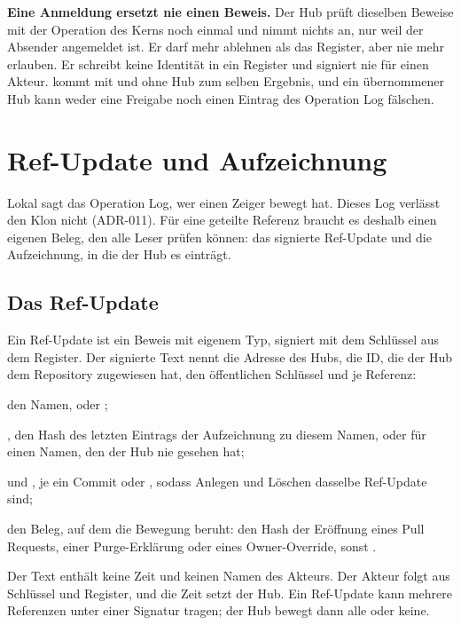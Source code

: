 \startinfobox
{\bf Eine Anmeldung ersetzt nie einen Beweis.}
Der Hub prüft dieselben Beweise mit der Operation des Kerns noch einmal und nimmt nichts an, nur
weil der Absender angemeldet ist.
Er darf mehr ablehnen als das Register, aber nie mehr erlauben.
Er schreibt keine Identität in ein Register und signiert nie für einen Akteur.
 kommt mit und ohne Hub zum selben Ergebnis, und ein übernommener Hub kann weder
eine Freigabe noch einen Eintrag des Operation Log fälschen.
\stopinfobox

\section[sec:ref-update]{Ref-Update und Aufzeichnung}

Lokal sagt das Operation Log, wer einen Zeiger bewegt hat.
Dieses Log verlässt den Klon nicht (ADR-011).
Für eine geteilte Referenz braucht es deshalb einen eigenen Beleg, den alle Leser prüfen können:
das signierte Ref-Update und die Aufzeichnung, in die der Hub es einträgt.

\subsection{Das Ref-Update}

Ein Ref-Update ist ein Beweis mit eigenem Typ, signiert mit dem Schlüssel aus dem Register.
Der signierte Text nennt die Adresse des Hubs, die ID, die der Hub dem Repository zugewiesen hat,
den öffentlichen Schlüssel und je Referenz:

\startitemize[packed]
\item den Namen,  oder ;
\item {}, den Hash des letzten Eintrags der Aufzeichnung zu diesem Namen, oder
\type{-} für einen Namen, den der Hub nie gesehen hat;
\item {} und , je ein Commit oder \type{-}, sodass Anlegen und Löschen
dasselbe Ref-Update sind;
\item den Beleg, auf dem die Bewegung beruht: den Hash der Eröffnung eines Pull Requests, einer
Purge-Erklärung oder eines Owner-Override, sonst \type{-}.
\stopitemize

Der Text enthält keine Zeit und keinen Namen des Akteurs.
Der Akteur folgt aus Schlüssel und Register, und die Zeit setzt der Hub.
Ein Ref-Update kann mehrere Referenzen unter einer Signatur tragen; der Hub bewegt dann alle
oder keine.

